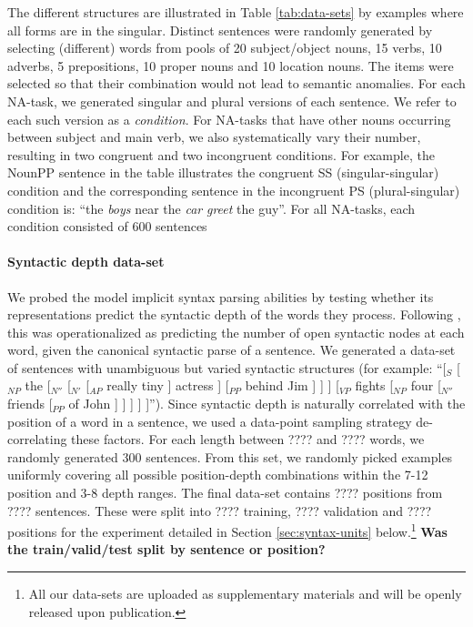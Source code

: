 The different structures are illustrated in Table \ref{tab:data-sets}
by examples where all forms are in the singular. Distinct sentences
were randomly generated by selecting (different) words from pools of
20 subject/object nouns, 15 verbs, 10 adverbs, 5 prepositions, 10
proper nouns and 10 location nouns. The items were selected so that
their combination would not lead to semantic anomalies. For each
NA-task, we generated singular and plural versions of each
sentence. We refer to each such version as a \textit{condition}. For
NA-tasks that have other nouns occurring between subject and main
verb, we also systematically vary their number, resulting in two
congruent and two incongruent conditions. For example, the NounPP
sentence in the table illustrates the congruent SS (singular-singular)
condition and the corresponding sentence in the incongruent PS (plural-singular)
condition is: ``the \emph{boys} near the \emph{car} \emph{greet} the guy''. For all
NA-tasks, each condition consisted of 600 sentences

\paragraph{Syntactic depth data-set} We probed the model implicit
syntax parsing abilities by testing whether its representations
predict the syntactic depth of the words they process. Following
, this was operationalized as predicting the
number of open syntactic nodes at each word, given the canonical
syntactic parse of a sentence.  We generated a data-set of sentences
with unambiguous but varied syntactic structures (for example: ``[$_S$
[$_{NP}$ the [$_{N''}$ [$_{N'}$ [$_{AP}$ really tiny ] actress ]
[$_{PP}$ behind Jim ] ] ] [$_{VP}$ fights [$_{NP}$ four [$_{N''}$
friends [$_{PP}$ of John ] ] ] ] ]''). Since syntactic depth is
naturally correlated with the position of a word in a sentence, we
used a data-point sampling strategy de-correlating these factors. For
each length between ????  and ???? words, we randomly generated 300
sentences. From this set, we randomly picked examples uniformly
covering all possible position-depth combinations within the 7-12
position and 3-8 depth ranges.  The final data-set contains ????
positions from ???? sentences. These were split into ???? training,
???? validation and ???? positions for the experiment detailed in
Section \ref{sec:syntax-units} below.\footnote{All our data-sets are
  uploaded as supplementary materials and will be openly released upon
  publication.} \textbf{Was the train/valid/test split by sentence or
  position?}

